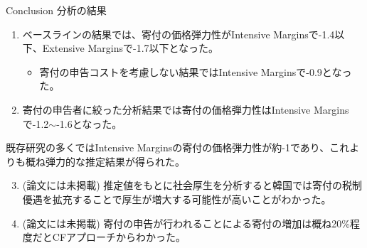 \documentclass[dvipdfmx,10pt]{beamer}
\begin{document}
	\begin{frame}{Conclusion}
	分析の結果
	\begin{enumerate}
		\item ベースラインの結果では、寄付の価格弾力性がIntensive Marginsで-1.4以下、Extensive Marginsで-1.7以下となった。
		\begin{itemize}
			\item 寄付の申告コストを考慮しない結果ではIntensive Marginsで-0.9となった。
		\end{itemize}
		\item 寄付の申告者に絞った分析結果では寄付の価格弾力性はIntensive Marginsで-1.2\(\sim\)-1.6となった。
	\end{enumerate}
	既存研究の多くではIntensive Marginsの寄付の価格弾力性が約-1であり、これよりも概ね弾力的な推定結果が得られた。
	\begin{enumerate}
		\setcounter{enumi}{2}
		\item (論文には未掲載) 推定値をもとに社会厚生を分析すると韓国では寄付の税制優遇を拡充することで厚生が増大する可能性が高いことがわかった。
		\item (論文には未掲載) 寄付の申告が行われることによる寄付の増加は概ね20\%程度だとCFアプローチからわかった。
	\end{enumerate}
\end{frame}
\end{document}
